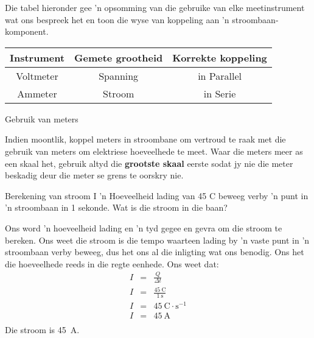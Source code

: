 
Die tabel hieronder gee 'n opsomming van die gebruike van elke meetinstrument
wat ons bespreek het en toon die wyse van koppeling aan 'n
stroombaan-komponent.

\begin{center}
\begin{tabular}{ | c | c | c | }
\hline 
\textbf{Instrument} & \textbf{Gemete grootheid} & \textbf{Korrekte koppeling}
\\ \hline \hline 
Voltmeter & Spanning & in Parallel \\ \hline Ammeter &
Stroom & in Serie \\ \hline
\hline
\end{tabular}
\end{center}


\begin{activity}{Gebruik van meters}

Indien moontlik, koppel meters in stroombane om vertroud te raak met die
gebruik van meters om elektriese hoeveelhede te meet. Waar die meters meer as
een skaal het, gebruik altyd die \textbf{grootste skaal} eerste sodat jy nie
die meter beskadig deur die meter se grens te oorskry nie.
\end{activity}



\begin{wex}{Berekening van stroom I}
{ 'n Hoeveelheid lading van 45 C beweeg verby 'n punt in 'n stroombaan in 1
sekonde. Wat is die stroom in die baan?
}{%

Ons word 'n hoeveelheid lading en 'n tyd gegee en gevra om die stroom te
bereken. Ons weet die stroom is die tempo waarteen lading by 'n vaste punt in
 'n stroombaan verby beweeg, dus het ons al die inligting wat ons benodig. Ons
het die hoeveelhede reeds in die regte eenhede.
Ons weet dat:
\begin{eqnarray*}
I &=& \frac{Q}{\Delta t} \\
I &=& \frac{45~\text{C}}{1~\text{s}} \\
I &=& 45~\text{C} \cdot \text{s}^{-1} \\
I &=& 45~\text{A} \\
\end{eqnarray*}
Die stroom is 45~A.
}
\end{wex}

